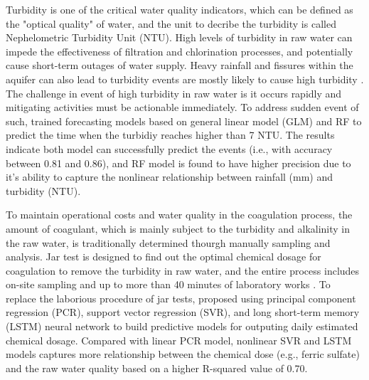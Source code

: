 Turbidity is one of the critical water quality indicators, which can be defined as the "optical quality" of water, and the unit to decribe the turbidity is called Nephelometric Turbidity Unit (NTU). High levels of turbidity in raw water can impede the effectiveness of filtration and chlorination processes, and potentially cause short-term outages of water supply. Heavy rainfall and fissures within the aquifer can also lead to turbidity events are mostly likely to cause high turbidity \citep{worldhealthorganizationWaterQualityHealth2017}. The challenge in event of high turbidity in raw water is it occurs rapidly and mitigating activities must be actionable immediately. To address sudden event of such, \citet{stevensonAdvancedTurbidityPrediction2019} trained forecasting models based on general linear model (GLM) and RF to predict the time when the turbidiy reaches higher than 7 NTU. The results indicate both model can successfully predict the events (i.e., with accuracy between 0.81 and 0.86), and RF model is found to have higher precision due to it's ability to capture the nonlinear relationship between rainfall (mm) and turbidity (NTU).

To maintain operational costs and water quality in the coagulation process, the amount of coagulant, which is mainly subject to the turbidity and alkalinity in the raw water, is traditionally determined thourgh manually sampling and analysis. Jar test is designed to find out the optimal chemical dosage for coagulation to remove the turbidity in raw water, and the entire process includes on-site sampling and up to more than 40 minutes of laboratory works \citep{ganiEffectPHAlum2017}. To replace the laborious procedure of jar tests, \citet{wangIntegratingWaterQuality2022} proposed using principal component regression (PCR), support vector regression (SVR), and long short-term memory (LSTM) neural network to build predictive models for outputing daily estimated chemical dosage. Compared with linear PCR model, nonlinear SVR and LSTM models captures more relationship between the chemical dose (e.g., ferric sulfate) and the raw water quality based on a higher R-squared value of 0.70.

